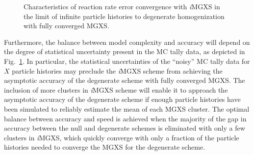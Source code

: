 \begin{figure}[ht!]
\centering
{}
\caption[Characteristics of reaction rate error convergence]{Characteristics of reaction rate error convergence with \textit{i}\ac{MGXS} in the limit of infinite particle histories to degenerate homogenization with fully converged \ac{MGXS}.}
\label{fig:chap11-coverge-complexity}
\end{figure}

Furthermore, the balance between model complexity and accuracy will depend on the degree of statistical uncertainty present in the \ac{MC} tally data, as depicted in Fig.~\ref{fig:chap11-coverge-complexity}. In particular, the statistical uncertainties of the ``noisy'' \ac{MC} tally data for $X$ particle histories may preclude the \textit{i}\ac{MGXS} scheme from achieving the asymptotic accuracy of the degenerate scheme with fully converged \ac{MGXS}. The inclusion of more clusters in \textit{i}\ac{MGXS} scheme will enable it to approach the asymptotic accuracy of the degenerate scheme if enough particle histories have been simulated to reliably estimate the mean of each \ac{MGXS} cluster. The optimal balance between accuracy and speed is achieved when the majority of the gap in accuracy between the null and degenerate schemes is eliminated with only a few clusters in \textit{i}\ac{MGXS}, which quickly converge with only a fraction of the particle histories needed to converge the \ac{MGXS} for the degenerate scheme.

